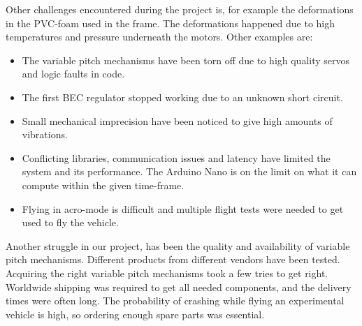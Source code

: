 Other challenges encountered during the project is, for example the deformations in the PVC-foam used in the frame. The deformations happened due to high temperatures and pressure underneath the motors. Other examples are:
\begin{itemize}
    \item The variable pitch mechanisms have been torn off due to high quality servos and logic faults in code. 
    \item The first BEC regulator stopped working due to an unknown short circuit.
    \item Small mechanical imprecision have been noticed to give high amounts of vibrations. 
    \item Conflicting libraries, communication issues and latency have limited the system and its performance. The Arduino Nano is on the limit on what it can compute within the given time-frame.
    \item Flying in acro-mode is difficult and multiple flight tests were needed to get used to fly the vehicle. 
\end{itemize}

Another struggle in our project, has been the quality and availability of variable pitch mechanisms. Different products from different vendors have been tested. Acquiring the right variable pitch mechanisms took a few tries to get right. Worldwide shipping was required to get all needed components, and the delivery times were often long. The probability of crashing while flying an experimental vehicle is high, so ordering enough spare parts was essential.\bigskip 






